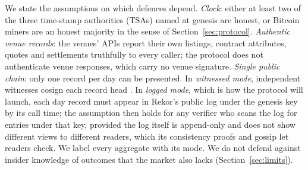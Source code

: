 \documentclass[11pt]{article}
\begin{document}
We state the assumptions on which defences depend. \emph{Clock}: either at least two of the three time-stamp authorities (TSAs) named at genesis are honest, or Bitcoin miners are an honest majority in the sense of Section~\ref{sec:protocol}. \emph{Authentic venue records}: the venues' APIs report their own listings, contract attributes, quotes and settlements truthfully to every caller; the protocol does not authenticate venue responses, which carry no venue signature. \emph{Single public chain}: only one record per day can be presented. In \emph{witnessed mode}, independent witnesses cosign each record head \citep{syta2016witness,c2sp_witness}. In \emph{logged mode}, which is how the protocol will launch, each day record must appear in Rekor's public log under the genesis key by its call time; the assumption then holds for any verifier who scans the log for entries under that key, provided the log itself is append-only and does not show different views to different readers, which its consistency proofs and gossip \citep{chuat2015gossip} let readers check. We label every aggregate with its mode. We do not defend against insider knowledge of outcomes that the market also lacks (Section~\ref{sec:limits}).
\end{document}
